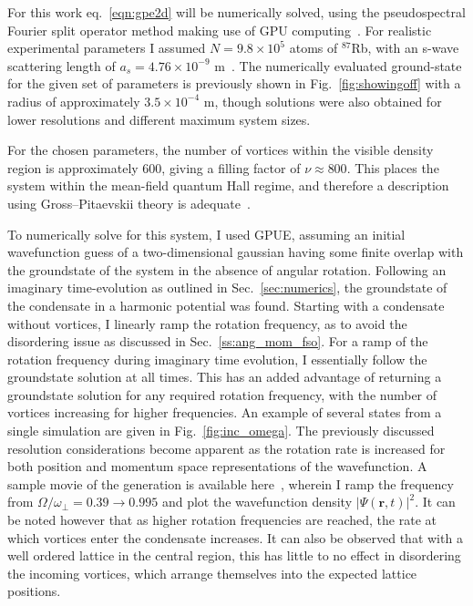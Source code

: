 For this work eq.~\eqref{eqn:gpe2d} will be numerically solved, using the pseudospectral Fourier split operator method making use of GPU computing~\cite{sec:GPUE}. For realistic experimental parameters I assumed  $N=9.8\times 10^5$ atoms of $^{87}$Rb, with an s-wave scattering length of $a_s=4.76\times10^{-9}$ m~\cite{AO:Roberts_prl_1998}. The numerically evaluated ground-state for the given set of parameters is previously shown in Fig.~\ref{fig:showingoff} with a radius of approximately $3.5\times 10^{-4}$ m, though solutions were also obtained for lower resolutions and different maximum system sizes.

For the chosen parameters, the number of vortices within the visible density region is approximately 600, giving a filling factor of $\nu \approx 800 $. This places the system within the mean-field quantum Hall regime, and therefore a description using Gross--Pitaevskii theory is adequate~\cite{Vtx:Schweikhard_prl_2004}.

To numerically solve for this system, I used GPUE, assuming an initial wavefunction guess of a two-dimensional gaussian having some finite overlap with the groundstate of the system in the absence of angular rotation. Following an imaginary time-evolution as outlined in Sec.~\ref{sec:numerics}, the groundstate of the condensate in a harmonic potential was found. Starting with a condensate without vortices, I linearly ramp the rotation frequency, as to avoid the disordering issue as discussed in Sec.~\ref{ss:ang_mom_fso}. For a ramp of the rotation frequency during imaginary time evolution, I essentially follow the groundstate solution at all times. This has an added advantage of returning a groundstate solution for any required rotation frequency, with the number of vortices increasing for higher frequencies. An example of several states from a single simulation are given in Fig.~\ref{fig:inc_omega}. The previously discussed resolution considerations become apparent as the rotation rate is increased for both position and momentum space representations of the wavefunction. A sample movie of the generation is available here~\cite{goo.gl/30Mj1q}, wherein I ramp the frequency from $\Omega/\omega_\perp = 0.39 \to 0.995$ and plot the wavefunction density $|\Psi(\mathbf{r},t)|^2$. It can be noted however that as higher rotation frequencies are reached, the rate at which vortices enter the condensate increases. It can also be observed that with a well ordered lattice in the central region, this has little to no effect in disordering the incoming vortices, which arrange themselves into the expected lattice positions.

